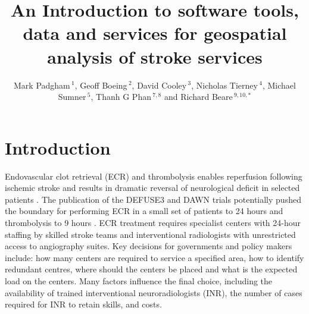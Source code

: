 \documentclass[utf8]{frontiersHLTH}
\def\firstAuthorLast{Padgham {et~al.}} %
\def\Authors{Mark Padgham\,$^{1}$, Geoff Boeing\,$^{2}$, David Cooley\,$^{3}$, Nicholas Tierney\,$^{4}$, Michael Sumner\,$^{5}$, Thanh G Phan\,$^{7,8}$ and Richard Beare\,$^{9,10,*}$}
\begin{document}
\onecolumn
{}

\title[Software tools for geospatial analysis]{An Introduction to software tools, data and services for geospatial analysis of stroke services}

\author[\firstAuthorLast ]{\Authors} %
\address{} %
\correspondance{} %

\extraAuth{}%

\maketitle

\section{Introduction}\label{introduction}

Endovascular clot retrieval (ECR) and thrombolysis enables reperfusion following ischemic
stroke and results in dramatic reversal of neurological deficit in
selected patients
\cite{berkhemer2015randomized,goyal2016endovascular,goyal2015randomized,campbell2015endovascular,saver2015stent,ma2019thrombolysis}. 
The publication of the DEFUSE3 and DAWN trials potentially pushed the
boundary for performing ECR in a small set of patients to 24
hours\cite{nogueira2018thrombectomy,albers2018thrombectomy} and
thrombolysis to 9 hours \cite{ma2019thrombolysis}. ECR treatment requires
specialist centers with 24-hour staffing by skilled stroke teams and
interventional radiologists with unrestricted access to angiography
suites. Key decisions for governments and policy makers include: how
many centers are required to service a specified area, how to identify
redundant centres, where should
the centers be placed and what is the expected load on the
centers\cite{Phan_2017}. Many factors influence the final choice,
including the availability of trained interventional neuroradiologists
(INR), the number of cases required for INR to retain skills, and
costs.
\end{document}
